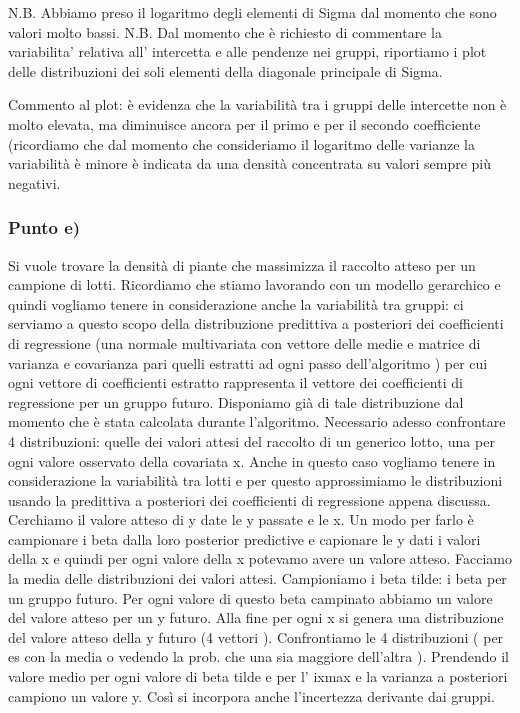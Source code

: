 N.B. Abbiamo preso il logaritmo degli elementi di Sigma dal momento che sono valori 
molto bassi. N.B. Dal momento che è richiesto di commentare la variabilita' 
relativa all' intercetta e alle pendenze nei gruppi, 
riportiamo i plot delle distribuzioni dei soli elementi della diagonale principale di 
Sigma. 

Commento al plot: è evidenza che la variabilità tra i gruppi delle intercette non è 
molto elevata, ma diminuisce ancora per il primo e per il secondo coefficiente 
(ricordiamo che dal momento che consideriamo il logaritmo delle varianze la 
variabilità è minore è indicata da una densità concentrata su valori sempre più 
negativi.


\subsubsection*{Punto e)}
Si vuole trovare la densità di piante che massimizza il raccolto atteso 
per un campione di lotti. Ricordiamo che stiamo lavorando con un modello 
gerarchico e quindi vogliamo tenere in considerazione anche la variabilità tra gruppi: 
ci serviamo a questo scopo della distribuzione predittiva a posteriori dei 
coefficienti di regressione (una normale multivariata con vettore delle medie e 
matrice di varianza e covarianza pari quelli estratti ad ogni passo dell'algoritmo ) 
per cui ogni vettore di coefficienti estratto rappresenta il vettore dei coefficienti 
di regressione per un gruppo futuro. Disponiamo già di tale distribuzione dal 
momento che è stata calcolata durante l'algoritmo. 
Necessario adesso confrontare 4 distribuzioni: quelle dei valori attesi del 
raccolto di un generico lotto, una per ogni valore osservato della covariata x. 
Anche in questo caso vogliamo tenere in considerazione la variabilità tra lotti e per 
questo approssimiamo le distribuzioni usando la predittiva a posteriori dei 
coefficienti di regressione appena discussa. Cerchiamo il valore atteso di y date 
le y passate e le x. Un modo per farlo è campionare i beta dalla loro posterior 
predictive e capionare le y dati i valori della x e quindi per ogni valore della x 
potevamo avere un valore atteso. Facciamo la media delle distribuzioni dei valori 
attesi. Campioniamo i beta tilde: i beta per un gruppo futuro. Per ogni valore di 
questo beta campinato abbiamo un valore del valore atteso per un y futuro. 
Alla fine per ogni x si genera una distribuzione del valore atteso della y futuro 
(4 vettori ). Confrontiamo le 4 distribuzioni ( per es con la media o vedendo la 
prob. che una sia maggiore dell'altra ). Prendendo il valore medio per ogni valore 
di beta tilde e per l' ixmax e la varianza a posteriori campiono un valore y. 
Così si incorpora anche l'incertezza derivante dai gruppi.

